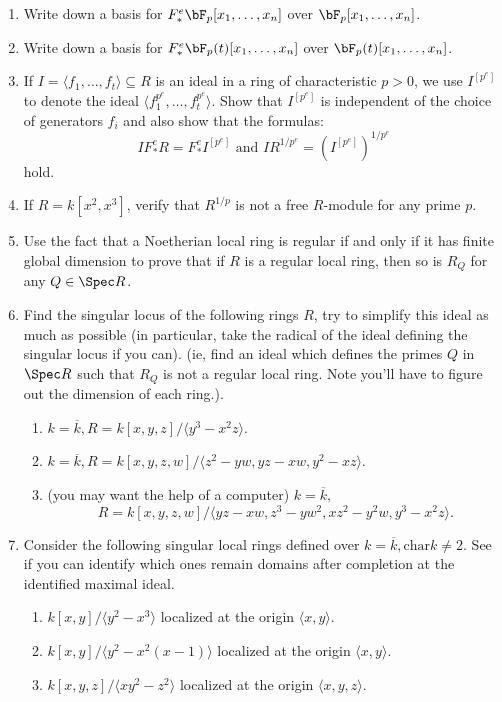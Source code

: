 \documentclass[12pt]{amsart}
\numberwithin{equation}{theorem}
\renewcommand{\:}{\colon}
\theoremstyle{theorem}
\begin{document}
\begin{enumerate}[label=(\arabic*)]
\item Write down a basis for $F^e_* \bF_p[x_1, \ldots, x_n]$ over $\bF_p[x_1, \ldots, x_n]$.
\item Write down a basis for $F^e_* \bF_p(t)[x_1, \ldots, x_n]$ over $\bF_p(t)[x_1, \ldots, x_n]$.
\item If $I = \langle f_1, \ldots, f_t \rangle \subseteq R$ is an ideal in a ring of characteristic $p > 0$, we use $I^{[p^e]}$ to denote the ideal $\langle f_1^{p^e}, \ldots, f_t^{p^e} \rangle$.  Show that $I^{[p^e]}$ is independent of the choice of generators $f_i$ and also show that the formulas:
    \[
    I F^e_* R = F^e_* I^{[p^e]} \text{ and } I R^{1/p^e} = (I^{[p^e]})^{1/p^e}
    \]
    hold.
\item If $R = k[x^2, x^3]$, verify that $R^{1/p}$ is not a free $R$-module for any prime $p$.
\item Use the fact that a Noetherian local ring is regular if and only if it has finite global dimension to prove that if $R$ is a regular local ring, then so is $R_Q$ for any $Q \in \Spec R$.
\item Find the singular locus of the following rings $R$, try to simplify this ideal as much as possible (in particular, take the radical of the ideal defining the singular locus if you can).
\vskip 3pt \noindent
(ie, find an ideal which defines the primes $Q$ in $\Spec R$ such that $R_Q$ is not a regular local ring.  Note you'll have to figure out the dimension of each ring.).
\begin{enumerate}
\item $k = \overline{k}, R = k[x,y,z]/\langle y^3- x^2 z \rangle$.
\item $k = \overline{k}, R = k[x,y,z,w]/\langle z^2 - yw, yz - xw, y^2 - xz \rangle$.
\item (you may want the help of a computer) $k = \overline{k},$  $$R = k[x,y,z,w]/\langle yz-xw,z^3-yw^2,xz^2-y^2w,y^3-x^2z \rangle.$$
\end{enumerate}
\item Consider the following singular local rings defined over $k = \overline{k}, \mathrm{char} k \neq 2$.  See if you can identify which ones remain domains after completion at the identified maximal ideal.
\begin{enumerate}
\item $k[x,y]/\langle y^2 - x^3 \rangle$ localized at the origin $\langle x, y \rangle$.
\item $k[x,y]/\langle y^2 - x^2(x-1) \rangle$ localized at the origin $\langle x,y \rangle$.
\item $k[x,y,z]/\langle xy^2 - z^2\rangle$ localized at the origin $\langle x, y, z \rangle$.
\end{enumerate}
\end{enumerate}
\end{document}
